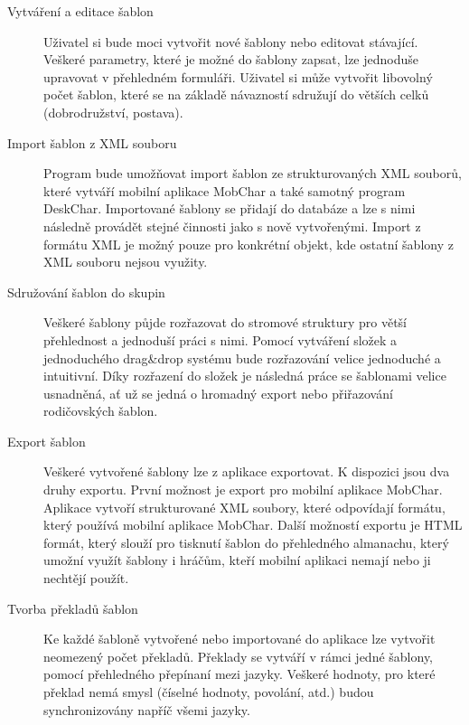 \documentclass[thesis=B,czech]{resources/FITthesis}[2012/06/26]
\begin{document}
\begin{description}
\item[Vytváření a editace šablon] Uživatel si bude moci vytvořit nové šablony nebo editovat stávající. Veškeré parametry, které je možné do šablony zapsat, lze jednoduše upravovat v přehledném formuláři. Uživatel si může vytvořit libovolný počet šablon, které se na základě návazností sdružují do větších celků (dobrodružství, postava).

\item[Import šablon z XML souboru] Program bude umožňovat import šablon ze strukturovaných XML souborů, které vytváří mobilní aplikace MobChar a také samotný program DeskChar. Importované šablony se přidají do databáze a lze s nimi následně provádět stejné činnosti jako s nově vytvořenými. Import z formátu XML je možný pouze pro konkrétní objekt, kde ostatní šablony z XML souboru nejsou využity.

\item[Sdružování šablon do skupin] Veškeré šablony půjde rozřazovat do stromové struktury pro větší přehlednost a jednoduší práci s nimi. Pomocí vytváření složek a jednoduchého drag\&drop systému bude rozřazování velice jednoduché a intuitivní. Díky rozřazení do složek je následná práce se šablonami velice usnadněná, ať už se jedná o hromadný export nebo přiřazování rodičovských šablon.

\item[Export šablon] Veškeré vytvořené šablony lze z aplikace exportovat. K dispozici jsou dva druhy exportu. První možnost je export pro mobilní aplikace MobChar. Aplikace vytvoří strukturované XML soubory, které odpovídají formátu, který používá mobilní aplikace MobChar. Další možností exportu je HTML formát, který slouží pro tisknutí šablon do přehledného almanachu, který umožní využít šablony i hráčům, kteří mobilní aplikaci nemají nebo ji nechtějí použít. 

\item[Tvorba překladů šablon] Ke každé šabloně vytvořené nebo importované do aplikace lze vytvořit neomezený počet překladů. Překlady se vytváří v rámci jedné šablony, pomocí přehledného přepínaní mezi jazyky. Veškeré hodnoty, pro které překlad nemá smysl (číselné hodnoty, povolání, atd.) budou synchronizovány napříč všemi jazyky.
\end{description}
\end{document}
